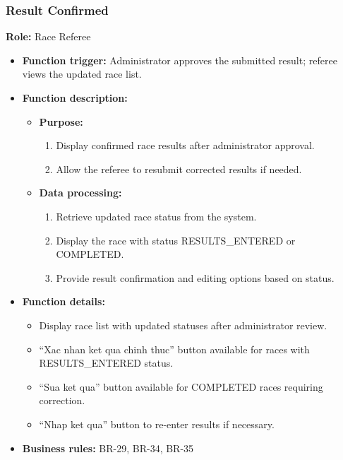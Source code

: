 
\subsubsection{Result Confirmed}

\textbf{Role:} Race Referee

\begin{itemize}
    \item \textbf{Function trigger:} Administrator approves the submitted result; referee views the updated race list.

    \item \textbf{Function description:}
    \begin{itemize}
        \item \textbf{Purpose:}
        \begin{enumerate}
            \item Display confirmed race results after administrator approval.
            \item Allow the referee to resubmit corrected results if needed.
        \end{enumerate}

        \item \textbf{Data processing:}
        \begin{enumerate}
            \item Retrieve updated race status from the system.
            \item Display the race with status RESULTS\_ENTERED or COMPLETED.
            \item Provide result confirmation and editing options based on status.
        \end{enumerate}
    \end{itemize}

    \item \textbf{Function details:}
    \begin{itemize}
        \item Display race list with updated statuses after administrator review.
        \item ``Xac nhan ket qua chinh thuc'' button available for races with RESULTS\_ENTERED status.
        \item ``Sua ket qua'' button available for COMPLETED races requiring correction.
        \item ``Nhap ket qua'' button to re-enter results if necessary.
    \end{itemize}
    \item \textbf{Business rules:} BR-29, BR-34, BR-35
\end{itemize}

